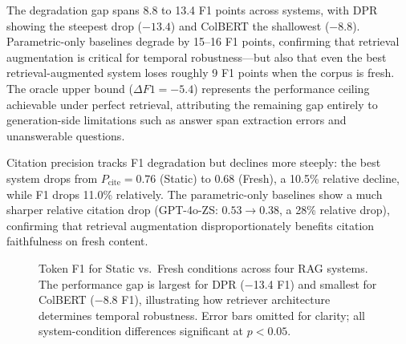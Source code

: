 The degradation gap spans 8.8 to 13.4 F1 points across systems, with DPR showing the steepest drop ($-13.4$) and ColBERT the shallowest ($-8.8$). Parametric-only baselines degrade by 15--16 F1 points, confirming that retrieval augmentation is critical for temporal robustness---but also that even the best retrieval-augmented system loses roughly 9 F1 points when the corpus is fresh. The oracle upper bound ($\Delta F1 = -5.4$) represents the performance ceiling achievable under perfect retrieval, attributing the remaining gap entirely to generation-side limitations such as answer span extraction errors and unanswerable questions.

Citation precision tracks F1 degradation but declines more steeply: the best system drops from $P_{\text{cite}} = 0.76$ (Static) to $0.68$ (Fresh), a 10.5\% relative decline, while F1 drops 11.0\% relatively. The parametric-only baselines show a much sharper relative citation drop (GPT-4o-ZS: $0.53 \to 0.38$, a 28\% relative drop), confirming that retrieval augmentation disproportionately benefits citation faithfulness on fresh content.

\begin{figure}[t]
\centering
{}
\caption{Token F1 for Static vs.\ Fresh conditions across four RAG systems. The performance gap is largest for DPR ($-$13.4 F1) and smallest for ColBERT ($-$8.8 F1), illustrating how retriever architecture determines temporal robustness. Error bars omitted for clarity; all system-condition differences significant at $p{<}0.05$.}
\label{fig:main-bar}
\end{figure}

